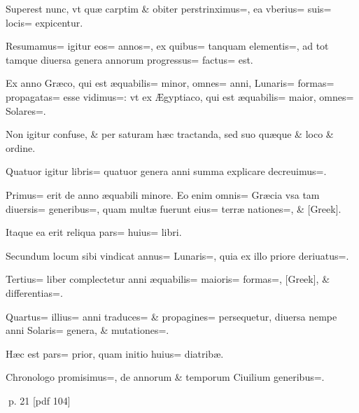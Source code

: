 \begin{parnumbers}
Superest nunc, vt quæ carptim \& obiter perstrinximus=, ea vberius= suis= locis= expicentur.

Resumamus= igitur eos= annos=, ex quibus= tanquam elementis=, ad tot tamque diuersa genera annorum progressus= factus= est.

Ex anno Græco, qui est æquabilis= minor, omnes= anni, Lunaris= formas= propagatas= esse vidimus=: vt ex Ægyptiaco, qui est æquabilis= maior, omnes= Solares=.

Non igitur confuse, \& per saturam hæc tractanda, sed suo quæque \& loco \& ordine.

Quatuor igitur libris= quatuor genera anni summa explicare decreuimus=.

Primus= erit de anno æquabili minore. Eo enim omnis= Græcia vsa tam diuersis= generibus=, quam multæ fuerunt eius= terræ nationes=, \& [Greek].

Itaque ea erit reliqua pars= huius= libri.

Secundum locum sibi vindicat annus=  Lunaris=, quia ex illo priore deriuatus=.

Tertius= liber complectetur anni æquabilis= maioris= formas=, [Greek], \& differentias=.

Quartus= illius= anni traduces= \& propagines= persequetur, diuersa nempe anni Solaris= genera, \& mutationes=.

Hæc est pars= prior, quam initio huius= diatribæ.

Chronologo promisimus=, de annorum \& temporum Ciuilium generibus=.

\end{parnumbers}
\clearpage
p. 21 [pdf 104]

